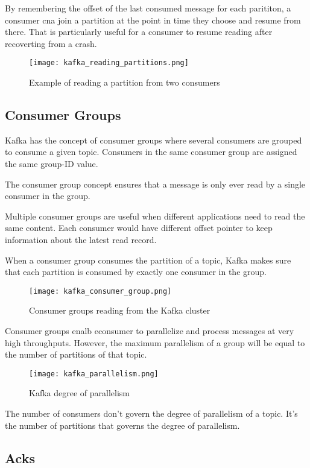 By remembering the offset of the last consumed message for each parititon, a
consumer cna join a partition at the point in time they choose and resume from
there. That is particularly useful for a consumer to resume reading after
recoverting from a crash.

\begin{figure}[ht]
    \centering
    \texttt{[image: kafka\_reading\_partitions.png]}
    \caption{Example of reading a partition from two consumers}
\end{figure}

\subsection{Consumer Groups}

Kafka has the concept of consumer groups where several consumers are grouped
to consume a given topic. Consumers in the same consumer group are assigned the
same group-ID value.

The consumer group concept ensures that a message is only ever read by a single
consumer in the group.

Multiple consumer groups are useful when different applications need to read
the same content. Each consumer would have different offset pointer to keep
information about the latest read record.

When a consumer group consumes the partition of a topic, Kafka makes sure that
each partition is consumed by exactly one consumer in the group.

\begin{figure}[ht]
    \centering
    \texttt{[image: kafka\_consumer\_group.png]}
    \caption{Consumer groups reading from the Kafka cluster}
\end{figure}

Consumer groups enalb econsumer to parallelize and process messages at very
high throughputs. However, the maximum parallelism of a group will be equal to
the number of partitions of that topic.

\begin{figure}[ht]
    \centering
    \texttt{[image: kafka\_parallelism.png]}
    \caption{Kafka degree of parallelism}
\end{figure}

The number of consumers don't govern the degree of parallelism of a topic.
It's the number of partitions that governs the degree of parallelism.

\subsection{Acks}

